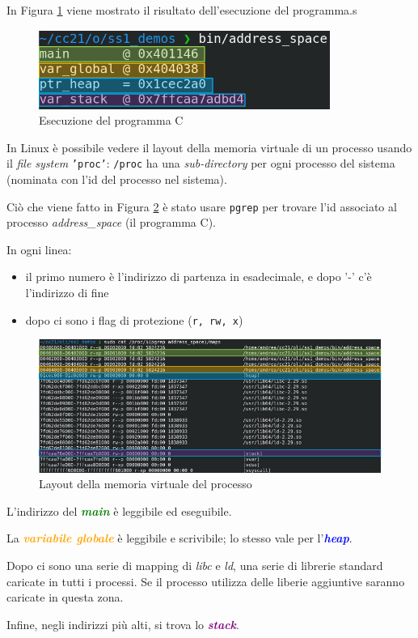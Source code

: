 In Figura \ref{fig:ex-c2} viene mostrato il risultato dell'esecuzione del programma.s

\begin{figure}[ht]
    \centering
    \includegraphics[width=0.75\linewidth]{images/example-2.png}
    \caption{Esecuzione del programma C}
    \label{fig:ex-c2}
\end{figure}

In Linux è possibile vedere il layout della memoria virtuale di un processo usando
il \textit{file system} \texttt{'proc'}: \texttt{/proc} ha una \textit{sub-directory} per
ogni processo del sistema (nominata con l'id del processo nel sistema).

Ciò che viene fatto in Figura \ref{fig:ex-c3} è stato usare \texttt{pgrep} per trovare l'id associato al processo \textit{address\_space} (il
programma C).

In ogni linea:
\begin{itemize}
    \item il primo numero è l'indirizzo di partenza in esadecimale, e dopo '-' c'è l'indirizzo di fine
    \item dopo ci sono i flag di protezione (\texttt{r, rw, x})
\end{itemize}

\begin{figure}[ht]
    \centering
    \includegraphics[width=1\linewidth]{images/example-3.png}
    \caption{Layout della memoria virtuale del processo}
    \label{fig:ex-c3}
\end{figure}

L'indirizzo del  \textcolor{green}{\textbf{\textit{main}}} è leggibile ed eseguibile.

La \textcolor{orange}{\textbf{\textit{variabile globale}}} è leggibile e scrivibile; 
lo stesso vale per l'\textcolor{blue}{\textbf{\textit{heap}}}.

Dopo ci sono una serie di mapping di \textit{libc} e \textit{ld}, una serie di librerie standard
caricate in tutti i processi. Se il processo utilizza delle liberie aggiuntive saranno caricate in questa zona.

Infine, negli indirizzi più alti, si trova lo \textcolor{purple}{\textbf{\textit{stack}}}.


